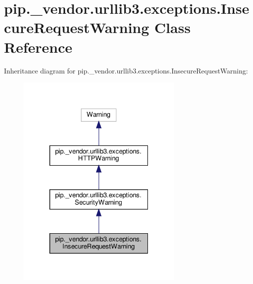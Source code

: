 \hypertarget{classpip_1_1__vendor_1_1urllib3_1_1exceptions_1_1InsecureRequestWarning}{}\section{pip.\+\_\+vendor.\+urllib3.\+exceptions.\+Insecure\+Request\+Warning Class Reference}
\label{classpip_1_1__vendor_1_1urllib3_1_1exceptions_1_1InsecureRequestWarning}


Inheritance diagram for pip.\+\_\+vendor.\+urllib3.\+exceptions.\+Insecure\+Request\+Warning\+:
\nopagebreak
\begin{figure}[H]
\begin{center}
\leavevmode
\includegraphics[width=229pt]{classpip_1_1__vendor_1_1urllib3_1_1exceptions_1_1InsecureRequestWarning__inherit__graph}
\end{center}
\end{figure}


